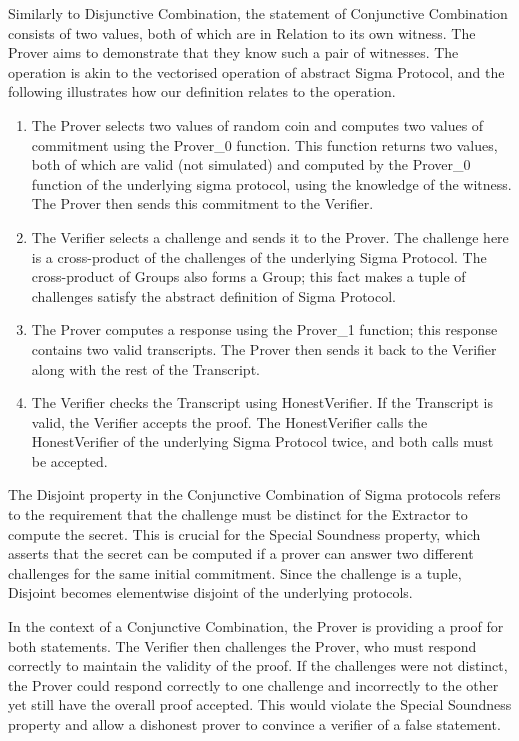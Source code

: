 Similarly to Disjunctive Combination, the statement of Conjunctive Combination consists of two values, both of which are in Relation to its own witness. 
The Prover aims to demonstrate that they know such a pair of witnesses. The operation is akin to the vectorised operation of abstract Sigma Protocol, 
and the following illustrates how our definition relates to the operation.

\begin{enumerate}
\item The Prover selects two values of random coin and computes two values of commitment using the Prover\_0 function. This function returns two values, 
both of which are valid (not simulated) and computed by the Prover\_0 function of the underlying sigma protocol, using the knowledge of the witness. 
The Prover then sends this commitment to the Verifier.
\item The Verifier selects a challenge and sends it to the Prover. The challenge here is a cross-product of the challenges of the underlying Sigma Protocol. 
The cross-product of Groups also forms a Group; this fact makes a tuple of challenges satisfy the abstract definition of Sigma Protocol.
\item The Prover computes a response using the Prover\_1 function; this response contains two valid transcripts. The Prover then sends it back to the 
Verifier along with the rest of the Transcript.
\item The Verifier checks the Transcript using HonestVerifier. If the Transcript is valid, the Verifier accepts the proof. The HonestVerifier calls the 
HonestVerifier of the underlying Sigma Protocol twice, and both calls must be accepted. 
\end{enumerate}

The Disjoint property in the Conjunctive Combination of Sigma protocols refers to the requirement that the challenge must be distinct for the 
Extractor to compute the secret. This is crucial for the Special Soundness property, which asserts that the secret can be computed if a prover 
can answer two different challenges for the same initial commitment.
Since the challenge is a tuple, Disjoint becomes elementwise disjoint of the underlying protocols.

In the context of a Conjunctive Combination, the Prover is providing a proof for both statements. The Verifier then challenges the Prover, 
who must respond correctly to maintain the validity of the proof. If the challenges were not distinct, the Prover could respond correctly 
to one challenge and incorrectly to the other yet still have the overall proof accepted. This would violate the Special Soundness property 
and allow a dishonest prover to convince a verifier of a false statement.

